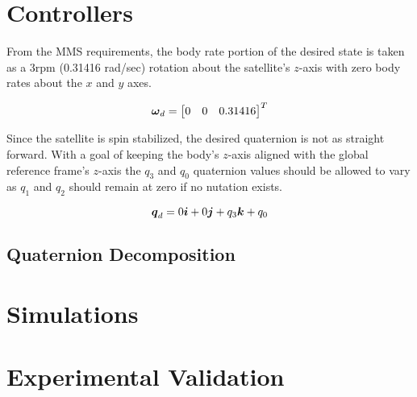 \section{Controllers}
\label{sec:Controller}
From the MMS requirements, the body rate portion of the desired state is taken as a 3rpm (0.31416 rad/sec) rotation about the satellite's $z$-axis with zero body rates about the $x$ and $y$ axes.

\begin{equation}
  \boldsymbol{\omega}_d = \begin{bmatrix} 0 & 0 & 0.31416 \end{bmatrix}^T
  \label{eqn:DesiredBodyRate}
\end{equation}

Since the satellite is spin stabilized, the desired quaternion is not as straight forward.  With a goal of keeping the body's $z$-axis aligned with the global reference frame's $z$-axis the $q_3$ and $q_0$ quaternion values should be allowed to vary as $q_1$ and $q_2$ should remain at zero if no nutation exists.

\begin{equation}
  \boldsymbol{q}_d = 0 \boldsymbol{i} + 0 \boldsymbol{j} + q_3 \boldsymbol{k} + q_0
  \label{eqn:DesiredQuaternion}
\end{equation}

\subsection{Quaternion Decomposition}
\label{subsec:QuaternionDecomposition}

\section{Simulations}
\label{sec:Simulations}

\section{Experimental Validation}
\label{sec:ExperimentalValidation}
